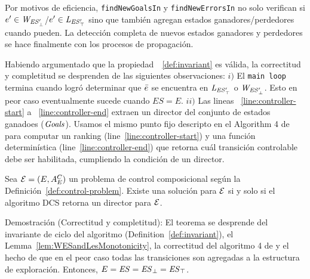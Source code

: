 Por motivos de eficiencia, \texttt{findNewGoalsIn} y
\texttt{findNewErrorsIn} no solo verifican si $e' \in \mathit{W_{\mathit{\mathit{ES}'_{\bot}}}}$/$e' \in 
\mathit{L_{\mathit{\mathit{ES}'_{\top}}}}$ sino que también agregan estados ganadores/perdedores cuando pueden. La detección completa de nuevos estados ganadores y perdedores se hace finalmente con los procesos de propagación. 


Habiendo argumentado que la propiedad~~\ref{def:invariant} es válida, la correctitud y completitud se desprenden de las siguientes observaciones:
$i)$ El \texttt{main loop} termina cuando logró determinar que 
$\bar{e}$ se encuentra en $\mathit{L_{\mathit{\mathit{ES}'_{\top}}}}$ o $\mathit{W_{\mathit{\mathit{ES}'_{\bot}}}}$. Esto en peor caso eventualmente sucede cuando $ES = E$.
$ii)$ Las lineas ~\ref{line:controller-start} a ~\ref{line:controller-end} extraen un director del conjunto de estados ganadoes
($\mathit{Goals}$). Usamos el mismo punto fijo descripto en el Algorithm 4 de 	\cite{Huang:2008:DCD} para computar un ranking (line~\ref{line:controller-start}) y una función determinística 
(line~\ref{line:controller-end}) que retorna cuál transición controlable debe ser habilitada, cumpliendo la condición de un director.

\begin{theorem}
Sea $\mathcal{E} = (E,A_E^C)$ un problema de control composicional según la Definición~\ref{def:control-problem}. Existe una solución para $\mathcal{E}$ si y solo si el algoritmo DCS retorna un director para $\mathcal{E}$.
\end{theorem}

Demostración (Correctitud y completitud):
El teorema se desprende del invariante de ciclo del algoritmo (Definition~\ref{def:invariant}), el
Lemma~\ref{lem:WESandLesMonotonicity}, la correctitud del algoritmo 4 de \cite{Huang:2008:DCD} y el hecho de que en el peor caso todas las transiciones son agregadas a la estructura de exploración. Entonces,  $E = \mathit{ES} = 
\mathit{\mathit{ES}_{\bot}} = \mathit{\mathit{ES}_{\top}}$.
